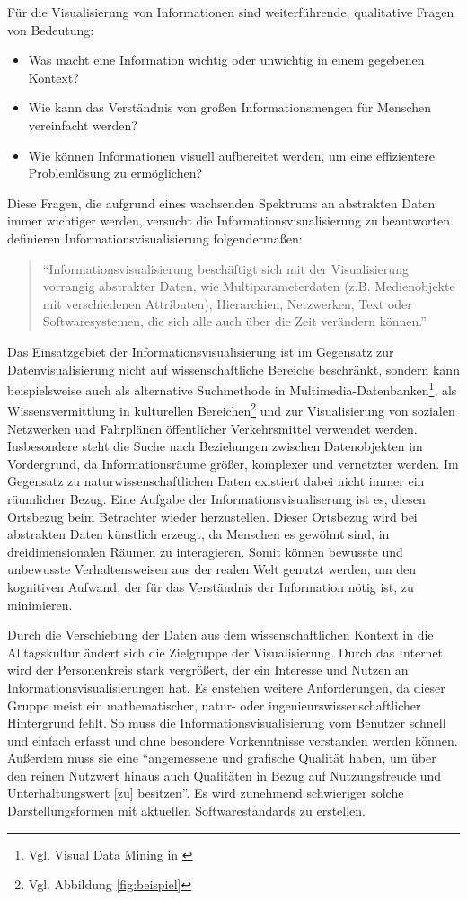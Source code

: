 \documentclass[a4paper, 
               12pt,
               DIV=calc,
               version=first,
               pdftex,
               headsepline,
               footsepline,
               bibtotocnumbered,
               liststotocnumbered]{scrreprt}
\begin{document}
Für die Visualisierung von Informationen sind weiterführende, qualitative Fragen von Bedeutung:
\begin{itemize}
\item Was macht eine Information wichtig oder unwichtig in einem gegebenen Kontext?
\item Wie kann das Verständnis von großen Informationsmengen für Menschen vereinfacht werden?
\item Wie können Informationen visuell aufbereitet werden, um eine effizientere Problemlösung zu ermöglichen?
\end{itemize}
Diese Fragen, die aufgrund eines wachsenden Spektrums an abstrakten Daten immer wichtiger werden,
versucht die Informationsvisualisierung zu beantworten.
\citep[S.\,434]{Preim} definieren Informationsvisualisierung folgendermaßen:
\begin{quote}
"`Informationsvisualisierung beschäftigt sich mit der Visualisierung vorrangig abstrakter Daten, wie
Multiparameterdaten (z.B. Medienobjekte mit verschiedenen Attributen), Hierarchien, Netzwerken, Text
oder Softwaresystemen, die sich alle auch über die Zeit verändern können."'
\end{quote}
Das Einsatzgebiet der Informationsvisualisierung ist im Gegensatz zur Datenvisualisierung nicht
auf wissenschaftliche Bereiche beschränkt,
sondern kann beispielsweise auch als alternative Suchmethode in Multimedia-Datenbanken\footnote{Vgl. Visual Data Mining in \citep{Keim}},
als Wissensvermittlung in kulturellen Bereichen\footnote{Vgl. Abbildung \ref{fig:beispiel}} und zur Visualisierung von
sozialen Netzwerken und Fahrplänen öffentlicher Verkehrsmittel verwendet werden.
Insbesondere steht die Suche nach Beziehungen zwischen Datenobjekten im Vordergrund,
da Informationsräume größer, komplexer und vernetzter werden. Im Gegensatz
zu naturwissenschaftlichen Daten existiert dabei nicht immer ein räumlicher Bezug.
Eine Aufgabe der Informationsvisualiserung ist es, diesen Ortsbezug beim Betrachter wieder herzustellen.
Dieser Ortsbezug wird bei abstrakten Daten künstlich erzeugt, da
Menschen es gewöhnt sind, in dreidimensionalen Räumen zu interagieren.
Somit können bewusste und unbewusste Verhaltensweisen aus der realen Welt genutzt werden, um den
kognitiven Aufwand, der für das Verständnis der Information nötig ist, zu minimieren.

Durch die Verschiebung der Daten aus dem wissenschaftlichen Kontext
in die Alltagskultur ändert sich die Zielgruppe der Visualisierung. Durch das Internet
wird der Personenkreis stark vergrößert, der ein Interesse und Nutzen an Informationsvisualisierungen
hat. Es enstehen weitere Anforderungen, da dieser Gruppe meist ein mathematischer, natur- oder ingenieurswissenschaftlicher Hintergrund
fehlt. So muss die Informationsvisualisierung vom Benutzer
schnell und einfach erfasst und ohne besondere Vorkenntnisse verstanden werden können.
Außerdem muss sie eine "`angemessene und grafische Qualität haben, um über den
reinen Nutzwert hinaus auch Qualitäten in Bezug auf Nutzungsfreude und Unterhaltungswert [zu] besitzen"'\citep[S.\,438]{Preim}.
Es wird zunehmend schwieriger solche Darstellungsformen mit aktuellen Softwarestandards zu erstellen.
\end{document}
